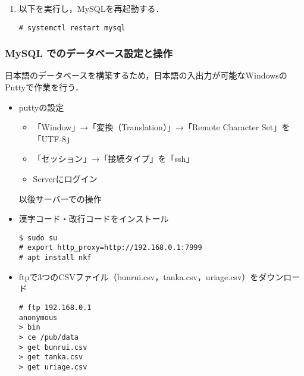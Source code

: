 \documentclass[a4j,titlepage]{jarticle}
\begin{document}
\begin{itemize}
\begin{enumerate}
\item 以下を実行し，MySQLを再起動する．
\begin{screen}
\begin{center}
\begin{verbatim}
# systemctl restart mysql
\end{verbatim}
\end{center}
\end{screen}

\end{enumerate}

\subsubsection{MySQL でのデータベース設定と操作}
日本語のデータベースを構築するため，日本語の入出力が可能なWindowsのPuttyで作業を行う．

\begin{itemize}
\item puttyの設定
\begin{itemize}
\item 「Window」→「変換（Translation）」→「Remote Character Set」を「UTF-8」
\item 「セッション」→「接続タイプ」を「ssh」
\item Serverにログイン
\end{itemize}

以後サーバーでの操作

\item 漢字コード・改行コードをインストール

\begin{center}
\begin{screen}
\begin{verbatim}
$ sudo su
# export http_proxy=http://192.168.0.1:7999
# apt install nkf
\end{verbatim}
\end{screen}
\end{center}

\item ftpで3つのCSVファイル（bunrui.csv，tanka.csv，uriage.csv）をダウンロード
\begin{center}
\begin{screen}
\begin{verbatim}
# ftp 192.168.0.1
anonymous
> bin
> ce /pub/data
> get bunrui.csv
> get tanka.csv
> get uriage.csv
\end{verbatim}
\end{screen}
\end{center}


\end{itemize}
\end{itemize}
\end{document}

